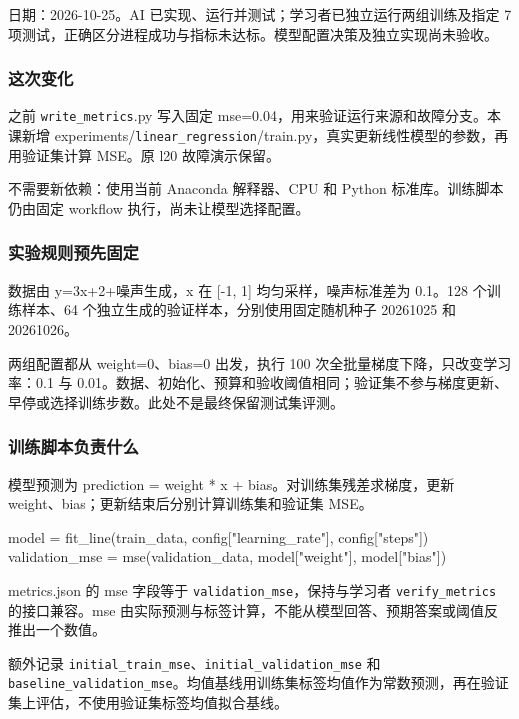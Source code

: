日期：2026-10-25。AI 已实现、运行并测试；学习者已独立运行两组训练及指定 7 项测试，正确区分进程成功与指标未达标。模型配置决策及独立实现尚未验收。

\subsubsection{这次变化}

之前 \nolinkurl{write_metrics}.py 写入固定 mse=0.04，用来验证运行来源和故障分支。本课新增 experiments/\nolinkurl{linear_regression}/train.py，真实更新线性模型的参数，再用验证集计算 MSE。原 l20 故障演示保留。

不需要新依赖：使用当前 Anaconda 解释器、CPU 和 Python 标准库。训练脚本仍由固定 workflow 执行，尚未让模型选择配置。

\subsubsection{实验规则预先固定}

数据由 y=3x+2+噪声生成，x 在 [-1, 1] 均匀采样，噪声标准差为 0.1。128 个训练样本、64 个独立生成的验证样本，分别使用固定随机种子 20261025 和 20261026。

两组配置都从 weight=0、bias=0 出发，执行 100 次全批量梯度下降，只改变学习率：0.1 与 0.01。数据、初始化、预算和验收阈值相同；验证集不参与梯度更新、早停或选择训练步数。此处不是最终保留测试集评测。

\subsubsection{训练脚本负责什么}

模型预测为 prediction = weight * x + bias。对训练集残差求梯度，更新 weight、bias；更新结束后分别计算训练集和验证集 MSE。

\begin{Code}
model = fit_line(train_data, config["learning_rate"], config["steps"])
validation_mse = mse(validation_data, model["weight"], model["bias"])
\end{Code}

metrics.json 的 mse 字段等于 \nolinkurl{validation_mse}，保持与学习者 \nolinkurl{verify_metrics} 的接口兼容。mse 由实际预测与标签计算，不能从模型回答、预期答案或阈值反推出一个数值。

额外记录 \nolinkurl{initial_train_mse}、\nolinkurl{initial_validation_mse} 和 \nolinkurl{baseline_validation_mse}。均值基线用训练集标签均值作为常数预测，再在验证集上评估，不使用验证集标签均值拟合基线。

